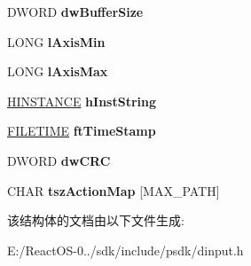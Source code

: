 \begin{DoxyCompactItemize}
\item 
\mbox{\label{struct___d_i_a_c_t_i_o_n_f_o_r_m_a_t_a_a65954d3636d2d0d54e2422f0f162fe94}} 
D\+W\+O\+RD {\bfseries dw\+Buffer\+Size}
\item 
\mbox{\label{struct___d_i_a_c_t_i_o_n_f_o_r_m_a_t_a_abef08bed372bef129885b2ca0c94de4c}} 
L\+O\+NG {\bfseries l\+Axis\+Min}
\item 
\mbox{\label{struct___d_i_a_c_t_i_o_n_f_o_r_m_a_t_a_af51cd6f4e6bd1d1edf672bfbefbf957b}} 
L\+O\+NG {\bfseries l\+Axis\+Max}
\item 
\mbox{\label{struct___d_i_a_c_t_i_o_n_f_o_r_m_a_t_a_a41867d474af8e15fbe7fe29554765fc4}} 
\hyperlink{interfacevoid}{H\+I\+N\+S\+T\+A\+N\+CE} {\bfseries h\+Inst\+String}
\item 
\mbox{\label{struct___d_i_a_c_t_i_o_n_f_o_r_m_a_t_a_a7fbb2e0c7efa734830800a50f40b1ea4}} 
\hyperlink{struct___f_i_l_e_t_i_m_e}{F\+I\+L\+E\+T\+I\+ME} {\bfseries ft\+Time\+Stamp}
\item 
\mbox{\label{struct___d_i_a_c_t_i_o_n_f_o_r_m_a_t_a_a49b9f5d5cffa2c0855718895fd102e2c}} 
D\+W\+O\+RD {\bfseries dw\+C\+RC}
\item 
\mbox{\label{struct___d_i_a_c_t_i_o_n_f_o_r_m_a_t_a_a2efdc83a66f71becae94af27bb5b2e0a}} 
C\+H\+AR {\bfseries tsz\+Action\+Map} \mbox{[}M\+A\+X\+\_\+\+P\+A\+TH\mbox{]}
\end{DoxyCompactItemize}


该结构体的文档由以下文件生成\+:\begin{DoxyCompactItemize}
\item 
E\+:/\+React\+O\+S-\/0../sdk/include/psdk/dinput.\+h\end{DoxyCompactItemize}
